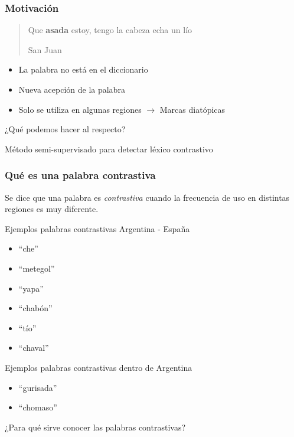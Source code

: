 
\begin{frame}[c]\frametitle{Motivación}

\blockquote[San Juan]{ Que \textbf{asada} estoy, tengo la cabeza echa un lío} \pause

\begin{itemize}
  \item La palabra no está en el diccionario \pause
  \item Nueva acepción de la palabra \pause
  \item Solo se utiliza en algunas regiones $\rightarrow$ Marcas diatópicas \pause   
\end{itemize}
  
  ¿Qué podemos hacer al respecto?\pause

  \alert{
  Método semi-supervisado para detectar léxico contrastivo
  }

\end{frame}

\begin{frame}[t]\frametitle{Qué es una palabra contrastiva}
    
    Se dice que una palabra es \textit{contrastiva} cuando la frecuencia de uso en distintas regiones es muy diferente. 

    \begin{block}{Ejemplos palabras contrastivas Argentina - España}
    
    \begin{multicols}{3}
    \begin{itemize}
      \item ``che''
      \item ``metegol''
      \item ``yapa''
      \item ``chabón''
      \item ``tío''
       \item ``chaval''
    \end{itemize}
  \end{multicols}

    \end{block}

    \begin{block}{Ejemplos palabras contrastivas dentro de Argentina}
     \begin{multicols}{2}
    \begin{itemize}
      \item ``gurisada''
      \item ``chomaso''
    \end{itemize}
  \end{multicols}

    \end{block}
    \medskip

    ¿Para qué sirve conocer las palabras contrastivas?

\end{frame}

